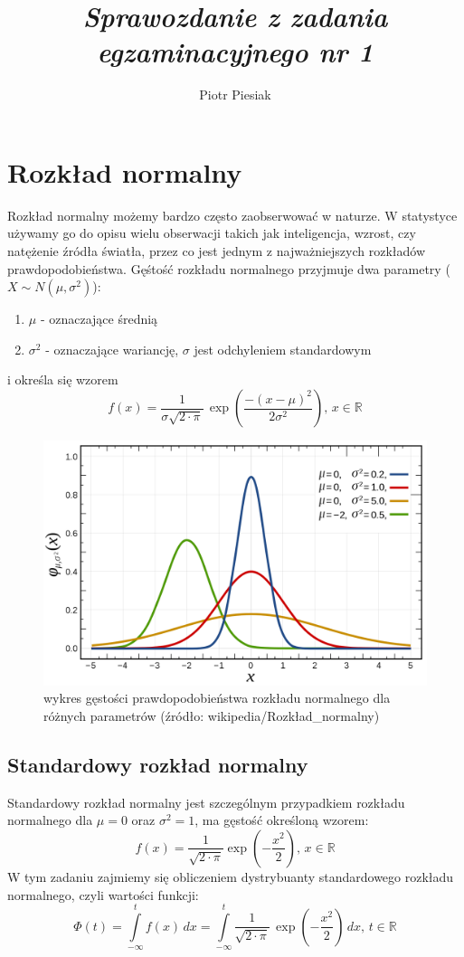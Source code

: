 \documentclass[a4paper]{article}
\title{\emph{Sprawozdanie z zadania egzaminacyjnego nr 1}}
\author{Piotr Piesiak}
\begin{document}
\maketitle
\section{Rozkład normalny}
Rozkład normalny możemy bardzo często zaobserwować w naturze. W statystyce używamy go do opisu wielu obserwacji takich jak inteligencja, wzrost, czy natężenie źródła światła, przez co jest jednym z najważniejszych rozkładów prawdopodobieństwa. Gęśtość rozkładu normalnego przyjmuje dwa parametry ($X \sim N(\mu,\sigma^2)$):
\begin{enumerate}
\item $\mu$ - oznaczające średnią
\item $\sigma^2$ - oznaczające wariancję, $\sigma$ jest odchyleniem standardowym
\end{enumerate}
i określa się wzorem
$$f(x) = \frac{1}{\sigma\sqrt{2\cdot\pi}}\,\exp\left(\frac {-(x-\mu )^2} {2\sigma^2}\right) ,\,x \in \mathbb{R}$$
\begin{figure}[htbp]
\centerline{\includegraphics[scale=.15]{wykres_ND.png}}
\caption{wykres gęstości prawdopodobieństwa rozkładu normalnego dla różnych parametrów \newline(źródło: wikipedia/Rozkład\_normalny)}
\label{fig:ND}
\end{figure}
\subsection{Standardowy rozkład normalny}
Standardowy rozkład normalny jest szczególnym przypadkiem rozkładu normalnego dla $\mu = 0$ oraz $\sigma^2 = 1$, ma gęstość określoną wzorem:
$$f(x) = \frac{1}{\sqrt{2\cdot\pi}}\exp\left(-\frac{x^2}{2}\right) ,\, x \in \mathbb{R}$$
W tym zadaniu zajmiemy się obliczeniem dystrybuanty standardowego rozkładu normalnego, czyli wartości funkcji:
$$\Phi(t) = \int\limits_{-\infty}^t f(x)\,dx = \int\limits_{-\infty}^t \frac{1}{\sqrt{2\cdot\pi}}\,\exp\left(-\frac{x^2}{2}\right)\,dx,\, t \in \mathbb{R}$$
\end{document}
